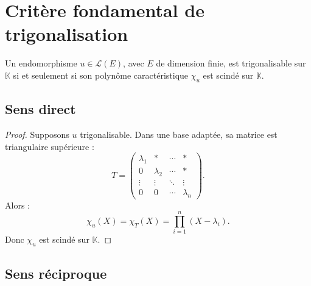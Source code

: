 \documentclass[11pt,a4paper]{article}
\newcommand{\K}{\mathbb K}
\newcommand{\Lcal}{\mathcal L}
\begin{document}
\section{Critère fondamental de trigonalisation}

\begin{theorembox}
Un endomorphisme \(u\in\Lcal(E)\), avec \(E\) de dimension finie, est trigonalisable sur \(\K\) si et seulement si son polynôme caractéristique \(\chi_u\) est scindé sur \(\K\).
\end{theorembox}

\subsection*{Sens direct}

\begin{proof}
Supposons \(u\) trigonalisable.  
Dans une base adaptée, sa matrice est triangulaire supérieure :
\[
T=
\begin{pmatrix}
\lambda_1&*&\cdots&*\\
0&\lambda_2&\cdots&*\\
\vdots&\vdots&\ddots&\vdots\\
0&0&\cdots&\lambda_n
\end{pmatrix}.
\]
Alors :
\[
\chi_u(X)=\chi_T(X)=\prod_{i=1}^n(X-\lambda_i).
\]
Donc \(\chi_u\) est scindé sur \(\K\).
\end{proof}

\subsection*{Sens réciproque}
\end{document}
